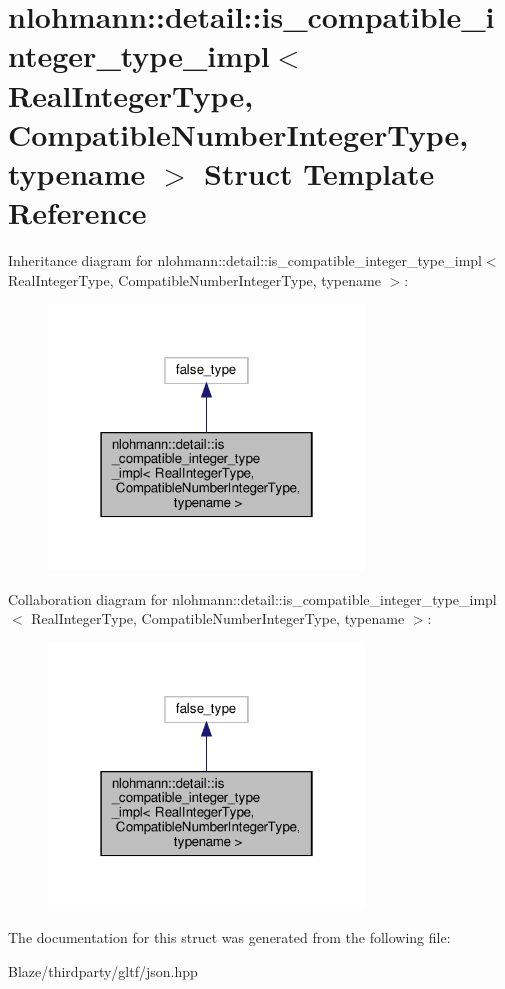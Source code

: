 \hypertarget{structnlohmann_1_1detail_1_1is__compatible__integer__type__impl}{}\section{nlohmann\+:\+:detail\+:\+:is\+\_\+compatible\+\_\+integer\+\_\+type\+\_\+impl$<$ Real\+Integer\+Type, Compatible\+Number\+Integer\+Type, typename $>$ Struct Template Reference}
\label{structnlohmann_1_1detail_1_1is__compatible__integer__type__impl}


Inheritance diagram for nlohmann\+:\+:detail\+:\+:is\+\_\+compatible\+\_\+integer\+\_\+type\+\_\+impl$<$ Real\+Integer\+Type, Compatible\+Number\+Integer\+Type, typename $>$\+:\nopagebreak
\begin{figure}[H]
\begin{center}
\leavevmode
\includegraphics[width=238pt]{structnlohmann_1_1detail_1_1is__compatible__integer__type__impl__inherit__graph}
\end{center}
\end{figure}


Collaboration diagram for nlohmann\+:\+:detail\+:\+:is\+\_\+compatible\+\_\+integer\+\_\+type\+\_\+impl$<$ Real\+Integer\+Type, Compatible\+Number\+Integer\+Type, typename $>$\+:\nopagebreak
\begin{figure}[H]
\begin{center}
\leavevmode
\includegraphics[width=238pt]{structnlohmann_1_1detail_1_1is__compatible__integer__type__impl__coll__graph}
\end{center}
\end{figure}


The documentation for this struct was generated from the following file\+:\begin{DoxyCompactItemize}
\item 
Blaze/thirdparty/gltf/json.\+hpp\end{DoxyCompactItemize}
